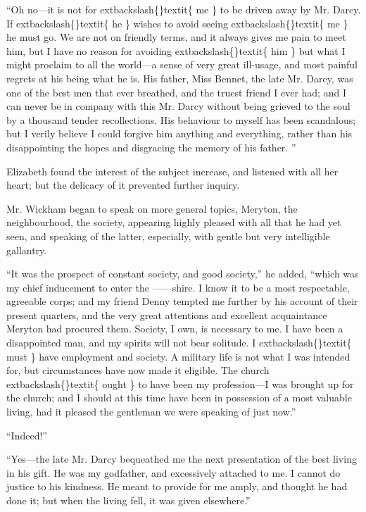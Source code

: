 \documentclass[10pt]{book}
\begin{document}
   “Oh no—it is not for
   	extbackslash\{\}textit\{
    me
   \}
   to be driven away by Mr. Darcy. If
   	extbackslash\{\}textit\{
    he
   \}
   wishes to avoid seeing
   	extbackslash\{\}textit\{
    me
   \}
   he must go. We are not on friendly terms,
and it always gives me pain to meet him, but I have no reason for
avoiding
   	extbackslash\{\}textit\{
    him
   \}
   but what I might proclaim to all the world—a sense of
very great ill-usage, and most painful regrets at his being what he is.
His father, Miss Bennet, the late Mr. Darcy, was one of the best men
that ever breathed, and the truest friend I ever had; and I can never be
in company with this Mr. Darcy without being grieved to the soul by a
thousand tender recollections. His behaviour to myself has been
scandalous; but I verily believe I could forgive him anything and
everything, rather than his disappointing the hopes and disgracing the
memory of his father.
   ”
  

   Elizabeth found the interest of the subject increase, and listened with
all her heart; but the delicacy of it prevented further inquiry.
  

   Mr. Wickham began to speak on more general topics, Meryton, the
neighbourhood, the society, appearing highly pleased with all that he
had yet seen, and speaking of the latter, especially, with gentle but
very intelligible gallantry.
  

   “It was the prospect of constant society, and good society,” he added,
“which was my chief inducement to enter the ——shire. I know it to be a
most respectable, agreeable corps; and my friend Denny tempted me
further by his account of their present quarters, and the very great
attentions and excellent acquaintance Meryton had procured them.
Society, I own, is necessary to me. I have been a disappointed man, and
my spirits will not bear solitude. I
   	extbackslash\{\}textit\{
    must
   \}
   have employment and society.
A military life is not what I was intended for, but circumstances have
now made it eligible. The church
   	extbackslash\{\}textit\{
    ought
   \}
   to have been my profession—I
was brought up for the church; and I should at this time have been in
possession of a most valuable living, had it pleased the gentleman we
were speaking of just now.”
  

   “Indeed!”
  

   “Yes—the late Mr. Darcy bequeathed me the next presentation of the best
living in his gift. He was my godfather, and excessively attached to me.
I cannot do justice to his kindness. He meant to provide for me amply,
and thought he had done it; but when the living fell, it was given
elsewhere.”
  
\end{document}
